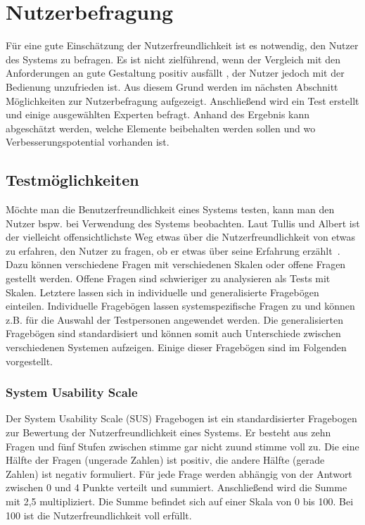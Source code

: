 \section{Nutzerbefragung}
\label{6:Nutzerbefragung}
Für eine gute Einschätzung der Nutzerfreundlichkeit ist es notwendig, den Nutzer des Systems zu befragen. Es ist nicht zielführend, wenn der Vergleich mit den Anforderungen an gute Gestaltung positiv ausfällt , der Nutzer jedoch mit der Bedienung unzufrieden ist. Aus diesem Grund werden im nächsten Abschnitt Möglichkeiten zur Nutzerbefragung aufgezeigt. Anschließend wird ein Test erstellt und einige ausgewählten Experten befragt. Anhand des Ergebnis kann abgeschätzt werden, welche Elemente beibehalten werden sollen und wo Verbesserungspotential vorhanden ist.

\subsection{Testmöglichkeiten}
Möchte man die Benutzerfreundlichkeit eines Systems testen, kann man den Nutzer bspw. bei Verwendung des Systems beobachten. Laut Tullis und Albert ist \glqq der vielleicht offensichtlichste Weg etwas über die Nutzerfreundlichkeit von etwas zu erfahren, den Nutzer zu fragen, ob er etwas über seine Erfahrung erzählt\grqq \ \citep[123]{Tullis2008}. Dazu können verschiedene Fragen mit verschiedenen Skalen oder offene Fragen gestellt werden. Offene Fragen sind schwieriger zu analysieren als Tests mit Skalen. Letztere lassen sich in individuelle und generalisierte Fragebögen einteilen. Individuelle Fragebögen lassen systemspezifische Fragen zu und können z.B. für die Auswahl der Testpersonen angewendet werden. Die generalisierten Fragebögen sind standardisiert und können somit auch Unterschiede zwischen verschiedenen Systemen aufzeigen. Einige dieser Fragebögen sind im Folgenden vorgestellt.

\subsubsection*{System Usability Scale}
Der System Usability Scale (SUS) Fragebogen ist ein standardisierter Fragebogen zur Bewertung der Nutzerfreundlichkeit eines Systems. Er besteht aus zehn Fragen und fünf Stufen zwischen \glqq stimme gar nicht zu\grqq und \glqq stimme voll zu\grqq. Die eine Hälfte der Fragen (ungerade Zahlen) ist positiv, die andere Hälfte (gerade Zahlen) ist negativ formuliert. Für jede Frage werden abhängig von der Antwort zwischen 0 und 4 Punkte verteilt und summiert. Anschließend wird die Summe mit 2,5 multipliziert. Die Summe befindet sich auf einer Skala von 0 bis 100. Bei 100 ist die Nutzerfreundlichkeit voll erfüllt. 

